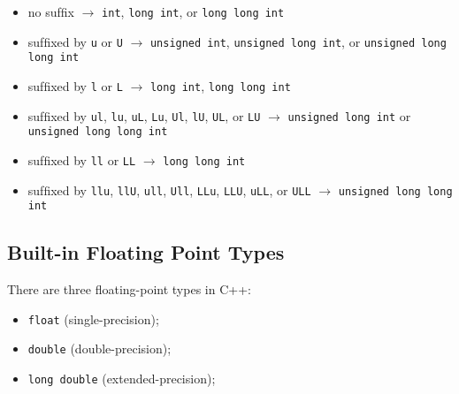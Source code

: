 \begin{itemize}
\item no sufﬁx $\rightarrow$ {\colorbox{CodeBackground}{\lstinline|int|}}, {\colorbox{CodeBackground}{\lstinline|long int|}}, or {\colorbox{CodeBackground}{\lstinline|long long int|}}
\item sufﬁxed by {\colorbox{CodeBackground}{\lstinline|u|}} or {\colorbox{CodeBackground}{\lstinline|U|}} $\rightarrow$ {\colorbox{CodeBackground}{\lstinline|unsigned int|}}, {\colorbox{CodeBackground}{\lstinline|unsigned long int|}}, or {\colorbox{CodeBackground}{\lstinline|unsigned long long int|}}
\item sufﬁxed by {\colorbox{CodeBackground}{\lstinline|l|}} or {\colorbox{CodeBackground}{\lstinline|L|}} $\rightarrow$ {\colorbox{CodeBackground}{\lstinline|long int|}}, {\colorbox{CodeBackground}{\lstinline|long long int|}}
\item sufﬁxed by {\colorbox{CodeBackground}{\lstinline|ul|}}, {\colorbox{CodeBackground}{\lstinline|lu|}}, {\colorbox{CodeBackground}{\lstinline|uL|}}, {\colorbox{CodeBackground}{\lstinline|Lu|}}, {\colorbox{CodeBackground}{\lstinline|Ul|}}, {\colorbox{CodeBackground}{\lstinline|lU|}}, {\colorbox{CodeBackground}{\lstinline|UL|}}, or {\colorbox{CodeBackground}{\lstinline|LU|}} $\rightarrow$ {\colorbox{CodeBackground}{\lstinline|unsigned long int|}} or {\colorbox{CodeBackground}{\lstinline|unsigned long long int|}}
\item sufﬁxed by {\colorbox{CodeBackground}{\lstinline|ll|}} or {\colorbox{CodeBackground}{\lstinline|LL|}} $\rightarrow$ {\colorbox{CodeBackground}{\lstinline|long long int|}}
\item sufﬁxed by {\colorbox{CodeBackground}{\lstinline|llu|}}, {\colorbox{CodeBackground}{\lstinline|llU|}}, {\colorbox{CodeBackground}{\lstinline|ull|}}, {\colorbox{CodeBackground}{\lstinline|Ull|}}, {\colorbox{CodeBackground}{\lstinline|LLu|}}, {\colorbox{CodeBackground}{\lstinline|LLU|}}, {\colorbox{CodeBackground}{\lstinline|uLL|}}, or {\colorbox{CodeBackground}{\lstinline|ULL|}} $\rightarrow$ {\colorbox{CodeBackground}{\lstinline|unsigned long long int|}}
\end{itemize}

\subsection{Built-in Floating Point Types}
There are three ﬂoating-point types in C++:
\begin{itemize}
\item {\colorbox{CodeBackground}{\lstinline|float|}} (single-precision);
\item {\colorbox{CodeBackground}{\lstinline|double|}} (double-precision);
\item {\colorbox{CodeBackground}{\lstinline|long double|}} (extended-precision);
\end{itemize}

